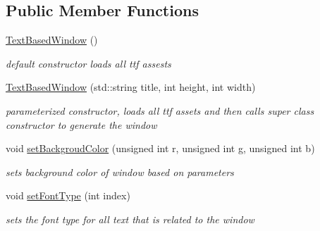 \subsection*{Public Member Functions}
\begin{DoxyCompactItemize}
\item 
\hypertarget{class_text_based_window_ac30a7e5e30df6c83b726b88e5617d8b9}{}\label{class_text_based_window_ac30a7e5e30df6c83b726b88e5617d8b9} 
\hyperlink{class_text_based_window_ac30a7e5e30df6c83b726b88e5617d8b9}{Text\+Based\+Window} ()
\begin{DoxyCompactList}\small\item\em default constructor loads all ttf assests \end{DoxyCompactList}\item 
\hypertarget{class_text_based_window_a9aa6b4d0324f25f6fb0d6d63e42baee1}{}\label{class_text_based_window_a9aa6b4d0324f25f6fb0d6d63e42baee1} 
\hyperlink{class_text_based_window_a9aa6b4d0324f25f6fb0d6d63e42baee1}{Text\+Based\+Window} (std\+::string title, int height, int width)
\begin{DoxyCompactList}\small\item\em parameterized constructor, loads all ttf assets and then calls super class constructor to generate the window \end{DoxyCompactList}\item 
\hypertarget{class_text_based_window_a757a07c1bcf51645a861bf8f648d1a30}{}\label{class_text_based_window_a757a07c1bcf51645a861bf8f648d1a30} 
void \hyperlink{class_text_based_window_a757a07c1bcf51645a861bf8f648d1a30}{set\+Backgroud\+Color} (unsigned int r, unsigned int g, unsigned int b)
\begin{DoxyCompactList}\small\item\em sets background color of window based on parameters \end{DoxyCompactList}\item 
\hypertarget{class_text_based_window_a3ee58753154ed16c97779f02df490eda}{}\label{class_text_based_window_a3ee58753154ed16c97779f02df490eda} 
void \hyperlink{class_text_based_window_a3ee58753154ed16c97779f02df490eda}{set\+Font\+Type} (int index)
\begin{DoxyCompactList}\small\item\em sets the font type for all text that is related to the window \end{DoxyCompactList}\item 
\hypertarget{class_text_based_window_a2b043b3eb12b21948d1135ade9162c5e}{}\label{class_text_based_window_a2b043b3eb12b21948d1135ade9162c5e} 

\end{DoxyCompactItemize}
